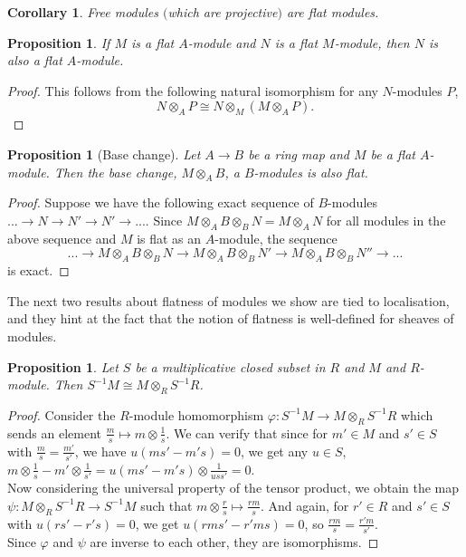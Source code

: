 \documentclass{article}
\theoremstyle{plain}
\newtheorem{proposition}[theorem]{Proposition}
\newtheorem{corollary}[theorem]{Corollary}
\theoremstyle{definition}
\begin{document}
\begin{corollary}
\label{free_modules_are_flat}
    Free modules $($which are projective$)$ are flat modules.
\end{corollary}

\begin{proposition}
\label{transitivity_flatness}
    If $M$ is a flat $A$-module and $N$ is a flat $M$-module, then $N$ is also a flat $A$-module.
\end{proposition}
\begin{proof}
    This follows from the following natural isomorphism for any $N$-modules $P$,
    $$N\otimes_A P \cong  N\otimes_M (M\otimes_A P).$$
\end{proof}





\begin{proposition}[Base change]
\label{bas_change_flat_mod}
    Let $A\rightarrow B$ be a ring map and $M$ be a flat $A$-module. Then the base change, $M\otimes_AB$, a $B$-modules is also flat.
\end{proposition}
\begin{proof}
    Suppose we have the following exact sequence of $B$-modules
    $...\rightarrow N\rightarrow N' \rightarrow N' \rightarrow ...$.
    Since $M\otimes_AB\otimes_B N = M\otimes_A N$ for all modules in the above sequence and $M$ is flat as an $A$-module, the sequence 
    $$...\rightarrow M\otimes_AB\otimes_B N\rightarrow M\otimes_AB\otimes_B N' \rightarrow M\otimes_AB\otimes_B N'' \rightarrow ...$$ 
    is exact.
\end{proof}




\noindent The next two results about flatness of modules we show are tied to localisation, and they hint at the fact that the notion of flatness is well-defined for sheaves of modules.


\begin{proposition}
\label{localization_as_tensor}
    Let $S$ be a multiplicative closed subset in $R$ and $M$ and $R$-module. Then $S^{-1}M \cong M\otimes_R S^{-1}R$.
\end{proposition}
\begin{proof}
    Consider the $R$-module homomorphism $\varphi :S^{-1}M\rightarrow M\otimes_R S^{-1}R$ which sends an element $\frac{m}{s} \mapsto m\otimes\frac{1}{s}$.
    We can verify that since for $m'\in M$ and $s'\in S$ with $\frac{m}{s}=\frac{m'}{s'}$, we have $u(ms'-m's)=0$, we get any $u\in S$,
    $m\otimes\frac{1}{s}-m'\otimes\frac{1}{s'} = u(ms'-m's)\otimes\frac{1}{uss'} = 0$.\\
    Now considering the universal property of the tensor product, we obtain the map \\
    $\psi : M\otimes_R S^{-1}R \rightarrow S^{-1}M$ such that $m\otimes\frac{r}{s}\mapsto\frac{rm}{s}$.
    And again, for $r'\in R$ and $s'\in S$ with $u(rs'-r's)=0$, we get $u(rms'-r'ms)=0$, so $\frac{rm}{s}=\frac{r'm}{s'}$.\\
    Since $\varphi$ and $\psi$ are inverse to each other, they are isomorphisms.
\end{proof}
\end{document}
